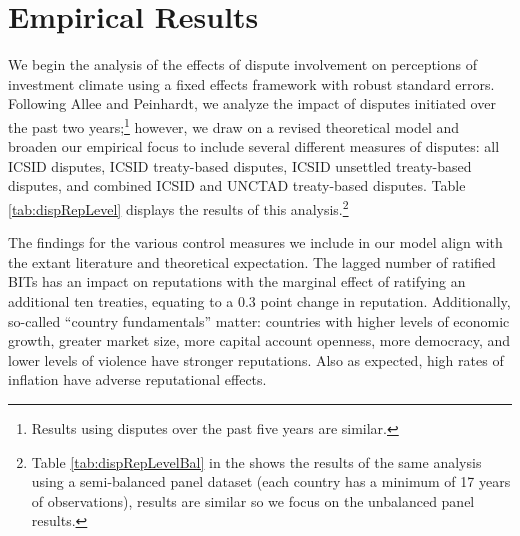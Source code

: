 \documentclass[12pt,onesided]{amsart}
\begin{document}
\section*{Empirical Results}

We begin the analysis of the effects of dispute involvement on perceptions of investment climate using a fixed effects framework with robust standard errors. Following Allee and Peinhardt, we analyze the impact of disputes initiated over the past two years;\footnote{Results using disputes over the past five years are similar.} however, we draw on a revised theoretical model and broaden our empirical focus to include several different measures of disputes: all ICSID disputes, ICSID treaty-based disputes, ICSID unsettled treaty-based disputes, and combined ICSID and UNCTAD treaty-based disputes. Table \ref{tab:dispRepLevel} displays the results of this analysis.\footnote{Table \ref{tab:dispRepLevelBal} in the  shows the results of the same analysis using a semi-balanced panel dataset (each country has a minimum of 17 years of observations), results are similar so we focus on the unbalanced panel results. }

The findings for the various control measures we include in our model align with the extant literature and theoretical expectation. The lagged number of ratified BITs has an impact on reputations with the marginal effect of ratifying an additional ten treaties, equating to a 0.3 point change in reputation. Additionally, so-called ``country fundamentals'' matter: countries with higher levels of economic growth, greater market size, more capital account openness, more democracy, and lower levels of violence have stronger reputations. Also as expected, high rates of inflation have adverse reputational effects.

\end{document}
